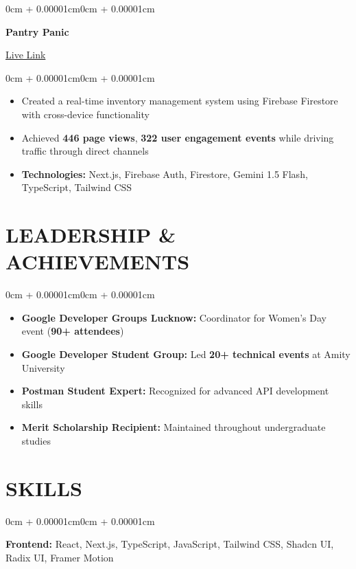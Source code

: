 \documentclass[10pt, letterpaper]{article}
\newenvironment{highlights}{
    \begin{itemize}[
        topsep=0.04cm,
        parsep=0.04cm,
        partopsep=0pt,
        itemsep=0.01cm,
        leftmargin=0.2cm + 9pt
    ]
}{
    \end{itemize}
}
\newenvironment{onecolentry}{
    \begin{adjustwidth}{0cm + 0.00001cm}{0cm + 0.00001cm}
}{
    \end{adjustwidth}
}
\newenvironment{twocolentry}[2][]{
    \onecolentry
    \def\secondColumn{#2}
    \setcolumnwidth{\fill, 4.2cm}
    \begin{paracol}{2}
}{
    \switchcolumn \raggedleft \secondColumn
    \end{paracol}
    \endonecolentry
}
\begin{document}
        \vspace{0.08cm}
        \begin{twocolentry}{
            \textcolor{primaryColor}{\href{https://pantry-panic.vercel.app}{Live Link}}
        }
            \textbf{Pantry Panic}
        \end{twocolentry}
        \vspace{0.02cm}
        \begin{onecolentry}
            \begin{highlights}
                \item Created a real-time inventory management system using Firebase Firestore with cross-device functionality
                \item Achieved \textbf{446 page views}, \textbf{322 user engagement events} while driving traffic through direct channels
                \item \textbf{Technologies:} Next.js, Firebase Auth, Firestore, Gemini 1.5 Flash, TypeScript, Tailwind CSS
            \end{highlights}
        \end{onecolentry}

    \section{LEADERSHIP \& ACHIEVEMENTS}
        \begin{onecolentry}
            \begin{highlights}
                \item \textbf{Google Developer Groups Lucknow:} Coordinator for Women's Day event (\textbf{90+ attendees})
                \item \textbf{Google Developer Student Group:} Led \textbf{20+ technical events} at Amity University
                \item \textbf{Postman Student Expert:} Recognized for advanced API development skills
                \item \textbf{Merit Scholarship Recipient:} Maintained throughout undergraduate studies
            \end{highlights}
        \end{onecolentry}

    \section{SKILLS}
        \begin{onecolentry}
            \textbf{Frontend:} \textcolor{primaryColor}{React}, \textcolor{primaryColor}{Next.js}, TypeScript, JavaScript, Tailwind CSS, Shadcn UI, Radix UI, Framer Motion
        \end{onecolentry}
        
\end{document}
